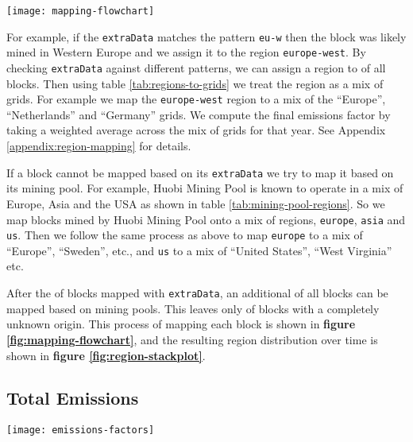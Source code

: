 \begin{figure*}[htp]
    \centering
    \texttt{[image: mapping-flowchart]}
    \caption{Process for mapping a block to an emissions factor.}
    \label{fig:mapping-flowchart}
\end{figure*}

For example, if the \texttt{extraData} matches the pattern \texttt{eu-w} then the block was likely mined in Western Europe and we assign it to the region \texttt{europe-west}. By checking \texttt{extraData} against  different patterns, we can assign a region to  of all blocks. Then using table \ref{tab:regions-to-grids} we treat the region as a mix of grids. For example we map the \texttt{europe-west} region to a mix of the ``Europe'', ``Netherlands'' and ``Germany'' grids. We compute the final emissions factor by taking a weighted average across the mix of grids for that year. See Appendix \ref{appendix:region-mapping} for details.

If a block cannot be mapped based on its \texttt{extraData} we try to map it based on its mining pool. For example, Huobi Mining Pool is known to operate in a mix of Europe, Asia and the USA as shown in table \ref{tab:mining-pool-regions}. So we map blocks mined by Huobi Mining Pool onto a mix of regions, \texttt{europe}, \texttt{asia} and \texttt{us}. Then we follow the same process as above to map \texttt{europe} to a mix of ``Europe'', ``Sweden'', etc., and \texttt{us} to a mix of ``United States'', ``West Virginia'' etc.

After the  of blocks mapped with \texttt{extraData}, an additional  of all blocks can be mapped based on  mining pools. This leaves only  of blocks with a completely unknown origin. This process of mapping each block is shown in \textbf{figure \ref{fig:mapping-flowchart}}, and the resulting region distribution over time is shown in \textbf{figure \ref{fig:region-stackplot}}.

\subsection{Total Emissions}

\begin{figure*}[htp]
    \centering
    \texttt{[image: emissions-factors]}
    \caption{Ethereum electricity emissions factor \ef{}, using data from regional emissions factors weighted by region estimated from block metadata.}
    \label{fig:emissions-factors}
\end{figure*}

